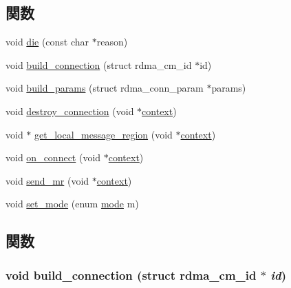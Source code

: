 \subsection*{関数}
\begin{DoxyCompactItemize}
\item 
void \hyperlink{rdma-common_8c_aac69fbddfabaad6d61082ad9e6f94505}{die} (const char $\ast$reason)
\item 
void \hyperlink{rdma-common_8c_a57b367ce7e3ae058aa4e2ad739e13ec2}{build\_\-connection} (struct rdma\_\-cm\_\-id $\ast$id)
\item 
void \hyperlink{rdma-common_8c_a1fa64af8a437eea7c184fbae1713e7cb}{build\_\-params} (struct rdma\_\-conn\_\-param $\ast$params)
\item 
void \hyperlink{rdma-common_8c_a54feeefad62ea6509ced24a1a06a7a6e}{destroy\_\-connection} (void $\ast$\hyperlink{structcontext}{context})
\item 
void $\ast$ \hyperlink{rdma-common_8c_a0162804c064e82d210197b0163278f39}{get\_\-local\_\-message\_\-region} (void $\ast$\hyperlink{structcontext}{context})
\item 
void \hyperlink{rdma-common_8c_a302021034f42b123904f59dad3990962}{on\_\-connect} (void $\ast$\hyperlink{structcontext}{context})
\item 
void \hyperlink{rdma-common_8c_aa7bbf375e749e0c78b50ff21ad9013f7}{send\_\-mr} (void $\ast$\hyperlink{structcontext}{context})
\item 
void \hyperlink{rdma-common_8c_abe5494f2e0e27dd073dafa13b2f89f5e}{set\_\-mode} (enum \hyperlink{rdma-common_8h_a1a6b6fb557d8d37d59700faf4e4c9167}{mode} m)
\end{DoxyCompactItemize}


\subsection{関数}
\hypertarget{rdma-common_8c_a57b367ce7e3ae058aa4e2ad739e13ec2}{
\subsubsection[{build\_\-connection}]{\setlength{\rightskip}{0pt plus 5cm}void build\_\-connection (struct rdma\_\-cm\_\-id $\ast$ {\em id})}}
\label{rdma-common_8c_a57b367ce7e3ae058aa4e2ad739e13ec2}


